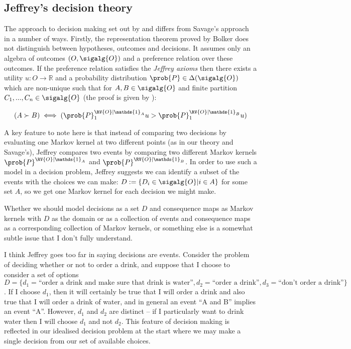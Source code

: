 
\subsection{Jeffrey's decision theory}

The approach to decision making set out by \citet{jeffrey_logic_1990} and \citet{bolker_functions_1966} differs from Savage's approach in a number of ways. Firstly, the representation theorem proved by Bolker does not distinguish between hypotheses, outcomes and decisions. It assumes only an algebra of outcomes $(O,\sigalg{O})$ and a preference relation over these outcomes. If the preference relation satisfies the \emph{Jeffrey axioms} then there exists a utility $u:O\to\mathbb{R}$ and a probability distribution $\prob{P}\in \Delta(\sigalg{O})$ which are non-unique such that for $A,B\in \sigalg{O}$ and finite partition $C_1,...,C_n\in \sigalg{O}$ (the proof is given by \citet{bolker_functions_1966}):

\begin{align}
    (A \succ B) \iff (\prob{P}^{\RV{O}|\mathds{1}_A}_1u>\prob{P}^{\RV{O}|\mathds{1}_B}_1u) \label{eq:ev_dec_theory}
\end{align}

A key feature to note here is that instead of comparing two decisions by evaluating one Markov kernel at two different points (as in our theory and Savage's), Jeffrey compares two events by comparing two different Markov kernels $\prob{P}^{\RV{O}|\mathds{1}_A}$ and $\prob{P}^{\RV{O}|\mathds{1}_B}$.  In order to use such a model in a decision problem, Jeffrey suggests we can identify a subset of the events with the choices we can make: $D:=\{D_i\in \sigalg{O}|i\in A\}$ for some set $A$, so we get one Markov kernel for each decision we might make. 

Whether we should model decisions as a set $D$ and consequence maps as Markov kernels with $D$ as the domain or as a collection of events and consequence maps as a corresponding collection of Markov kernels, or something else is a somewhat subtle issue that I don't fully understand.

I think Jeffrey goes too far in saying decisions are events. Consider the problem of deciding whether or not to order a drink, and suppose that I choose to consider a set of options $D=\{d_1=\text{``order a drink and make sure that drink is water''}, d_2=\text{``order a drink''}, d_3=\text{``don't order a drink''}\}$. If I choose $d_1$, then it will certainly be true that I will order a drink and also true that I will order a drink of water, and in general an event ``A and B'' implies an event ``A''. However, $d_1$ and $d_2$ are distinct -- if I particularly want to drink water then I will choose $d_1$ and not $d_2$. This feature of decision making is reflected in our idealised decision problem at the start where we may make a single decision from our set of available choices.

